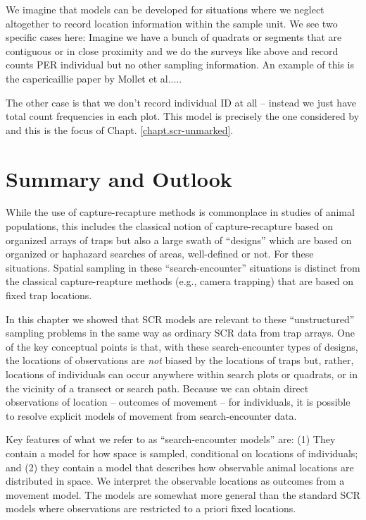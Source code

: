 We imagine that models can be developed for
situations where we neglect
altogether to record location information within the sample unit.
We see two specific cases here:
Imagine we have a bunch of quadrats or segments that are contiguous or
in close proximity
and we do the surveys like above and record counts PER individual  but
no other sampling information. An example of this is the capericaillie
paper by Mollet et al.....

The other case is that we don't record individual ID at all -- instead
we just have total count frequencies in each plot.
This model is precisely the one considered by
\citep{chandler_royle:2012} and this is the focus of Chapt. \ref{chapt.scr-unmarked}.





\section{Summary and Outlook}

While the use of capture-recapture methods
is commonplace in studies of animal
populations, this includes the classical notion of capture-recapture
based on organized arrays of traps but also a large swath of
``designs'' which are based on organized or haphazard
searches of areas, well-defined or not. For these situations.
Spatial sampling in these ``search-encounter'' situations is distinct
from the classical capture-reapture methods
(e.g., camera trapping) that are based on fixed trap locations.

 In this chapter we showed that SCR models are
relevant to these ``unstructured'' sampling problems in the same way
as ordinary SCR data from trap arrays. One of the key conceptual
points is that, with these search-encounter types of designs, the
locations of observations are {\it not} biased by the locations of
traps but, rather, locations of individuals can occur anywhere within
search plots or quadrats, or in the vicinity of a transect or search
path.  Because we can obtain direct observations of location --
outcomes of movement -- for individuals, it is possible to resolve
explicit models of movement from search-encounter data.  

Key features of what we refer to as ``search-encounter models'' are: 
(1) They contain a model for how space is
sampled, conditional on locations of individuals; and (2) they contain 
a model that
describes how observable animal locations are distributed in space.
We interpret the observable locations as outcomes from a movement
model.  
The models
are somewhat more general than the standard SCR models where
observations are restricted to a priori fixed locations. 

